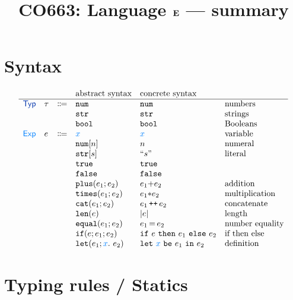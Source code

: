 \documentclass[11pt]{article}
\begin{document}
\title{CO663: Language $\textbf{E}$ ---  summary}

\date{\vspace{-7ex}}
\maketitle


\newcommand{\lazyeval}[1]{\framebox{\parbox[c][#1]{\textwidth}{
      \color{white}{h}%
    }}}


\section{Syntax}

\[
\begin{array}{llclll} 
  & & & \text{abstract syntax} & \text{concrete syntax}
  \\\hline
  \TYPES & \tau & \Coloneqq & \enum{}  & \enum{} & \text{numbers}
  \\
  &&& \estr{} & \estr{} & \text{strings}
  \\
  &&& \ebool{} & \ebool{} & \text{Booleans}
  \\ 
  \EXPS & e & \Coloneqq  & \var{x} & \var{x} & \text{variable}
  \\
  &&& \enum{n} & n & \text{numeral}
  \\
  &&& \estr{s} & \litstr{s} & \text{literal}
  \\
  &&&  \ktrue & \ktrue 
  \\ 
  &&&  \kfalse & \kfalse 
  \\
  &&& \eplus{e_1}{e_2} & e_1 {+} e_2 & \text{addition}
  \\
  &&& \etimes{e_1}{e_2} & e_1 {*} e_2 & \text{multiplication}
  \\
  &&& \ecat{e_1}{e_2} & e_1 \concat e_2 & \text{concatenate}
  \\
  &&& \elen{e} & \lvert e \rvert & \text{length}
  \\
  &&& \eequal{e_1}{e_2} & e_1 \meq e_2 & \text{number equality}
  \\
  &&& \site{e}{e_1}{e_2} & \csite{e}{e_1}{e_2} & \text{if then else}
  \\
  &&& \elet{e_1}{x}{e_2} & \clet{e_1}{x}{e_2} & \text{definition}
\end{array}
\]

\section{Typing rules / Statics}
\end{document}
